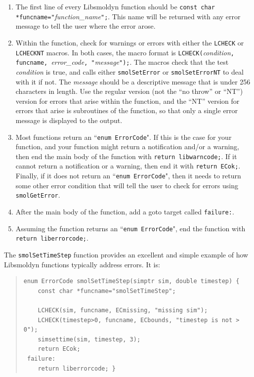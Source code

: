 \documentclass {scrbook}
\newcommand {\ttt} {\texttt}
\begin{document}
\begin{enumerate}
\item The first line of every Libsmoldyn function should be \ttt{const char *funcname="}\emph{function\_name}\ttt{";}. This name will be returned with any error message to tell the user where the error arose.
\item Within the function, check for warnings or errors with either the \ttt{LCHECK} or \ttt{LCHECKNT} macros. In both cases, the macro format is \ttt{LCHECK(}\emph{condition}\ttt{, funcname, }\emph{error\_code}\ttt{, "}\emph{message}\ttt{");}. The macros check that the test \emph{condition} is true, and calls either \ttt{smolSetError} or \ttt{smolSetErrorNT} to deal with it if not. The \emph{message} should be a descriptive message that is under 256 characters in length. Use the regular version (not the ``no throw'' or ``NT'') version for errors that arise within the function, and the ``NT'' version for errors that arise is subroutines of the function, so that only a single error message is displayed to the output.
\item Most functions return an ``\ttt{enum ErrorCode}". If this is the case for your function, and your function might return a notification and/or a warning, then end the main body of the function with \ttt{return libwarncode;}. If it cannot return a notification or a warning, then end it with \ttt{return ECok;}. Finally, if it does not return an ``\ttt{enum ErrorCode}", then it needs to return some other error condition that will tell the user to check for errors using \ttt{smolGetError}.
\item After the main body of the function, add a goto target called \ttt{failure:}.
\item Assuming the function returns an ``\ttt{enum ErrorCode}", end the function with \ttt{return liberrorcode;}.
\end{enumerate}

The \ttt{smolSetTimeStep} function provides an excellent and simple example of how Libsmoldyn functions typically address errors. It is:

\begin{quote}
\begin{lstlisting}[style=SSAC]
enum ErrorCode smolSetTimeStep(simptr sim, double timestep) {
	const char *funcname="smolSetTimeStep";

	LCHECK(sim, funcname, ECmissing, "missing sim");
	LCHECK(timestep>0, funcname, ECbounds, "timestep is not > 0");
	simsettime(sim, timestep, 3);
	return ECok;
 failure:
	return liberrorcode; }
\end{lstlisting}
\end{quote}
\end{document}
